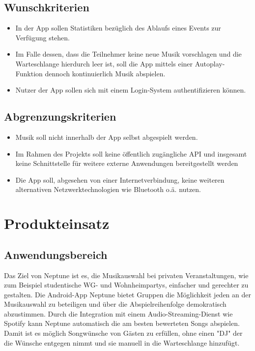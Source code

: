 \documentclass[oneside, ngerman]{sdqtechreport}
\begin{document}
\section{Wunschkriterien}
\label{sec:Zielbestimmungen:Wunschkriterien}
\begin{itemize}
    \item In der App sollen Statistiken bezüglich des Ablaufs eines Events zur Verfügung stehen.
    \item Im Falle dessen, dass die Teilnehmer keine neue Musik vorschlagen und die Warteschlange hierdurch leer ist, soll die App mittels einer Autoplay-Funktion dennoch kontinuierlich Musik abspielen.
    \item Nutzer der App sollen sich mit einem Login-System authentifizieren können.

\end{itemize}

\section{Abgrenzungskriterien}
\label{sec:Zielbestimmungen:Abgrenzungskriterien}
\begin{itemize}
    \item Musik soll nicht innerhalb der App selbst abgespielt werden.
    \item Im Rahmen des Projekts soll keine öffentlich zugängliche API und insgesamt keine Schnittstelle für weitere externe Anwendungen bereitgestellt werden
    \item Die App soll, abgesehen von einer Internetverbindung, keine weiteren alternativen Netzwerktechnologien wie Bluetooth o.ä. nutzen.

\end{itemize}


\chapter{Produkteinsatz}
\label{chap:Produkteinsatz}

\section{Anwendungsbereich}
\label{sec:Produkteinsatz:Anwendungsbereich}
\textbf{}Das Ziel von Neptune ist es, die Musikauswahl bei privaten Veranstaltungen, wie zum Beispiel studentische WG- und Wohnheimpartys, einfacher und gerechter zu gestalten.
Die Android-App Neptune bietet Gruppen die Möglichkeit jeden an der Musikauswahl zu beteiligen und über die Abspielreihenfolge demokratisch abzustimmen. Durch die Integration mit einem Audio-Streaming-Dienst wie Spotify kann Neptune automatisch die am besten bewerteten Songs abspielen. Damit ist es möglich Songwünsche von Gästen zu erfüllen, ohne einen "DJ"  der die Wünsche entgegen nimmt und sie manuell in die Warteschlange hinzufügt.
\end{document}
